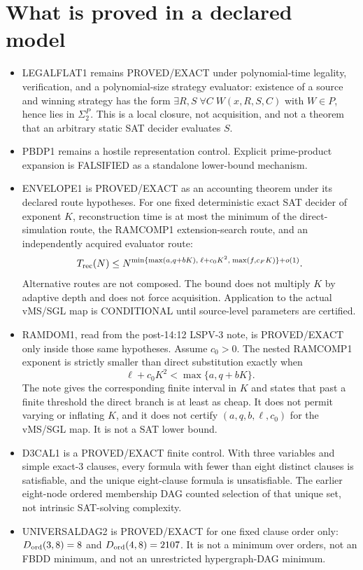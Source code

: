 \documentclass[11pt]{article}
\begin{document}
\section*{What is proved in a declared model}
\begin{itemize}
\item LEGALFLAT1 remains PROVED/EXACT under polynomial-time legality, verification, and a
polynomial-size strategy evaluator: existence of a source and winning strategy has the form
\(\exists R,S\;\forall C\;W(x,R,S,C)\) with \(W\in P\), hence lies in \(\Sigma_2^P\).
This is a local closure, not acquisition, and not a theorem that an arbitrary static SAT
decider evaluates \(S\).
\item PBDP1 remains a hostile representation control. Explicit prime-product expansion is
FALSIFIED as a standalone lower-bound mechanism.
\item ENVELOPE1 is PROVED/EXACT as an accounting theorem under its declared route
hypotheses. For one fixed deterministic exact SAT decider of exponent \(K\), reconstruction
time is at most the minimum of the direct-simulation route, the RAMCOMP1 extension-search
route, and an independently acquired evaluator route:
\[
T_{\rm rec}(N)\le N^{\min\{\max(a,q+bK),\;\ell+c_0K^2,\;\max(f,c_FK)\}+o(1)}.
\]
Alternative routes are not composed. The bound does not multiply \(K\) by adaptive depth
and does not force acquisition. Application to the actual vMS/SGL map is CONDITIONAL
until source-level parameters are certified.
\item RAMDOM1, read from the post-14:12 LSPV-3 note, is PROVED/EXACT only inside those
same hypotheses. Assume \(c_0>0\). The nested RAMCOMP1 exponent is strictly smaller than
direct substitution exactly when
\[
\ell+c_0K^2<\max\{a,q+bK\}.
\]
The note gives the corresponding finite interval in \(K\) and states that past a finite
threshold the direct branch is at least as cheap. It does not permit varying or inflating
\(K\), and it does not certify \((a,q,b,\ell,c_0)\) for the vMS/SGL map. It is not a SAT
lower bound.
\item D3CAL1 is a PROVED/EXACT finite control. With three variables and simple exact-3
clauses, every formula with fewer than eight distinct clauses is satisfiable, and the
unique eight-clause formula is unsatisfiable. The earlier eight-node ordered membership
DAG counted selection of that unique set, not intrinsic SAT-solving complexity.
\item UNIVERSALDAG2 is PROVED/EXACT for one fixed clause order only:
\(D_{\rm ord}(3,8)=8\) and \(D_{\rm ord}(4,8)=2107\). It is not a minimum over orders,
not an FBDD minimum, and not an unrestricted hypergraph-DAG minimum.
\end{itemize}
\end{document}
